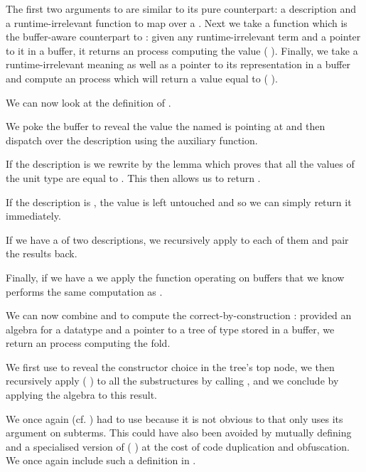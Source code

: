 
The first two arguments to  are similar to its pure
counterpart: a description  and a runtime-irrelevant function
 to map over a .
%
Next we take a function which is the buffer-aware counterpart to :
given any runtime-irrelevant term  and a pointer to it in a buffer,
it returns an  process computing the value ( ).
%
Finally, we take a runtime-irrelevant meaning 
as well as a pointer to its representation in a buffer and compute
an  process which will return a value equal to
(   ).

We can now look at the definition of .


We poke the buffer to reveal the value the 
named  is pointing at and then dispatch over the description
 using the  auxiliary function.

If the description is  we rewrite by the lemma
 which proves that all the values of the unit type
are equal to \IdrisData{()}. This then allows us to return \IdrisData{()}.

If the description is , the value is left untouched and so
we can simply return it immediately.

If we have a  of two descriptions, we recursively apply
 to each of them and pair the results back.

Finally, if we have a  we apply the function operating
on buffers that we know performs the same computation as .


We can now combine  and  to compute
the correct-by-construction : provided an algebra for
a datatype  and a pointer to a tree of type 
stored in a buffer, we return an  process computing the fold.


We first use  to reveal the constructor choice in the
tree's top node, we then recursively apply ( )
to all the substructures by calling , and we conclude by
applying the algebra to this result.

We once again (cf. ) had to
use \assertTotal{} because it is not obvious to
\idris{} that  only uses its argument on subterms.
%
This could have also been avoided by mutually defining 
and a specialised version of
( \IdrisKeyword{(} \IdrisKeyword{)})
at the cost of code duplication and obfuscation.
%
We once again include such a definition in .
